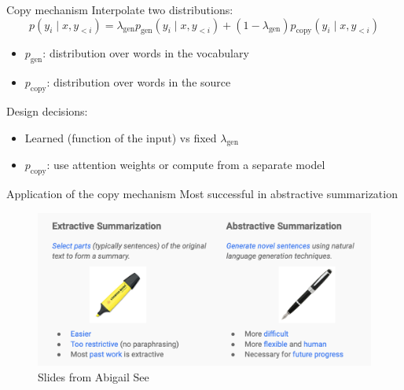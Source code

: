 \documentclass[usenames,dvipsnames,11pt,aspectratio=169]{beamer}
\begin{document}
\begin{frame}
    {Copy mechanism}
    Interpolate two distributions:
    $$
    p(y_i\mid x, y_{<i}) = \lambda_{\text{gen}}p_{\text{gen}}(y_i\mid x, y_{<i})
    + (1 - \lambda_{\text{gen}})p_{\text{copy}}(y_i\mid x, y_{<i})
    $$
    \vspace{-2em}
    \begin{itemize}
        \item $p_{\text{gen}}$: distribution over words in the vocabulary
        \item $p_{\text{copy}}$: distribution over words in the source
    \end{itemize}

    Design decisions:\\
    \begin{itemize}
        \item Learned (function of the input) vs fixed $\lambda_{\text{gen}}$
        \item $p_{\text{copy}}$: use attention weights or compute from a separate model
    \end{itemize}
\end{frame}

\begin{frame}
    {Application of the copy mechanism}
    Most successful in abstractive summarization
    \vspace{-1em}
    \begin{figure}
        \includegraphics[width=12cm]{figures/summarization}
        \caption{Slides from Abigail See}
    \end{figure}
\end{frame}
\end{document}
